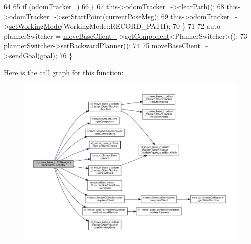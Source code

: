 \begin{DoxyCode}
64 
65         \textcolor{keywordflow}{if} (\hyperlink{classcl__move__base__z_1_1CbNavigateBackwards_a75a8ae7aef6c72e96f4037c4941b0341}{odomTracker\_})
66         \{
67             this->\hyperlink{classcl__move__base__z_1_1CbNavigateBackwards_a75a8ae7aef6c72e96f4037c4941b0341}{odomTracker\_}->\hyperlink{classcl__move__base__z_1_1odom__tracker_1_1OdomTracker_a93a14e15e3e623f530e056f403bf7644}{clearPath}();
68             this->\hyperlink{classcl__move__base__z_1_1CbNavigateBackwards_a75a8ae7aef6c72e96f4037c4941b0341}{odomTracker\_}->\hyperlink{classcl__move__base__z_1_1odom__tracker_1_1OdomTracker_a9f4989c6353022c2ec3b0546c09bf3bc}{setStartPoint}(currentPoseMsg);
69             this->\hyperlink{classcl__move__base__z_1_1CbNavigateBackwards_a75a8ae7aef6c72e96f4037c4941b0341}{odomTracker\_}->\hyperlink{classcl__move__base__z_1_1odom__tracker_1_1OdomTracker_aeed01bdefd9a1cc709b0b3e4eed285ed}{setWorkingMode}(WorkingMode::RECORD\_PATH);
70         \}
71 
72         \textcolor{keyword}{auto} plannerSwitcher = \hyperlink{classcl__move__base__z_1_1CbNavigateBackwards_a943c1a790eac9266adf11fbdc078f03a}{moveBaseClient\_}->\hyperlink{classsmacc_1_1ISmaccClient_adef78db601749ca63c19e74a27cb88cc}{getComponent}<PlannerSwitcher>();
73         plannerSwitcher->setBackwardPlanner();
74 
75         \hyperlink{classcl__move__base__z_1_1CbNavigateBackwards_a943c1a790eac9266adf11fbdc078f03a}{moveBaseClient\_}->\hyperlink{classsmacc_1_1client__bases_1_1SmaccActionClientBase_a9c47a5094ac8afb01680307fe5eca922}{sendGoal}(goal);
76     \}
\end{DoxyCode}
Here is the call graph for this function\+:
\nopagebreak
\begin{figure}[H]
\begin{center}
\leavevmode
\includegraphics[width=350pt]{classcl__move__base__z_1_1CbNavigateBackwards_a545a5282f0ef6b0080b46002d6037567_cgraph}
\end{center}
\end{figure}
\mbox{\label{classcl__move__base__z_1_1CbNavigateBackwards_a92858e20e6401051203f5dfa4aef60dc}} 
